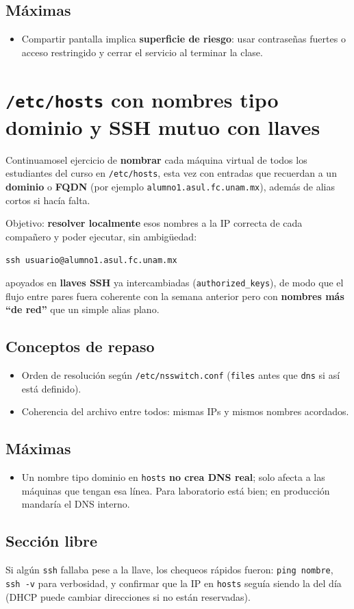 \documentclass[11pt, letterpaper]{article}
\begin{document}
\subsection{Máximas}
\label{sec:orgd1b301a}
\begin{itemize}
\item Compartir pantalla implica \textbf{superficie de riesgo}: usar contraseñas fuertes o acceso restringido y cerrar el servicio al terminar la clase.
\end{itemize}
\section{\texttt{/etc/hosts} con nombres tipo dominio y SSH mutuo con llaves}
\label{sec:orge9e198a}

Continuamosel ejercicio de \textbf{nombrar} cada máquina virtual de todos los estudiantes del curso en \texttt{/etc/hosts}, esta vez con entradas que recuerdan a un \textbf{dominio} o \textbf{FQDN} (por ejemplo \texttt{alumno1.asul.fc.unam.mx}), además de alias cortos si hacía falta.

Objetivo: \textbf{resolver localmente} esos nombres a la IP correcta de cada compañero y poder ejecutar, sin ambigüedad:

\begin{verbatim}
ssh usuario@alumno1.asul.fc.unam.mx
\end{verbatim}

apoyados en \textbf{llaves SSH} ya intercambiadas (\texttt{authorized\_keys}), de modo que el flujo entre pares fuera coherente con la semana anterior pero con \textbf{nombres más “de red”} que un simple alias plano.
\subsection{Conceptos de repaso}
\label{sec:orga4aae81}
\begin{itemize}
\item Orden de resolución según \texttt{/etc/nsswitch.conf} (\texttt{files} antes que \texttt{dns} si así está definido).
\item Coherencia del archivo entre todos: mismas IPs y mismos nombres acordados.
\end{itemize}
\subsection{Máximas}
\label{sec:org0678160}
\begin{itemize}
\item Un nombre tipo dominio en \texttt{hosts} \textbf{no crea DNS real}; solo afecta a las máquinas que tengan esa línea. Para laboratorio está bien; en producción mandaría el DNS interno.
\end{itemize}
\subsection{Sección libre}
\label{sec:org8936850}
Si algún \texttt{ssh} fallaba pese a la llave, los chequeos rápidos fueron: \texttt{ping nombre}, \texttt{ssh -v} para verbosidad, y confirmar que la IP en \texttt{hosts} seguía siendo la del día (DHCP puede cambiar direcciones si no están reservadas).
\end{document}
